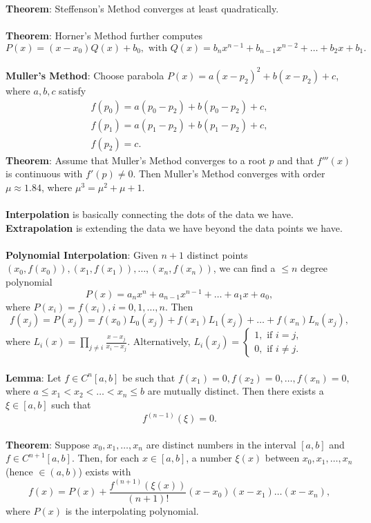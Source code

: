 \documentclass{article}
\begin{document}
\textbf{Theorem}: Steffenson’s Method converges at least quadratically. \\ \\
\textbf{Theorem}: Horner’s Method further computes $$P(x) = (x - x_0)Q(x) + b_0, \text{ with } Q(x) = b_nx^{n - 1} + b_{n - 1}x^{n - 2} + \dots + b_2x + b_1.$$ \\
\textbf{Muller's Method}: Choose parabola $P(x) = a(x - p_2)^2 + b(x - p_2) + c$, where $a, b, c$ satisfy \begin{align*}
    f(p_0) = a(p_0 - p_2) + b(p_0 - p_2) + c, \\
    f(p_1) = a(p_1 - p_2) + b(p_1 - p_2) + c, \\
    f(p_2) = c.
\end{align*} $ $ \\
\textbf{Theorem}: Assume that Muller's Method converges to a root $p$ and that $f'''(x)$ is continuous with $f'(p) \neq 0$. Then Muller’s Method converges with order $\mu \approx 1.84$, where $\mu^3 = \mu^2 + \mu + 1$. \\ \\
\textbf{Interpolation} is basically connecting the dots of the data we have. \textbf{Extrapolation} is extending the data we have beyond the data points we have. \\ \\
\textbf{Polynomial Interpolation}: Given $n + 1$ distinct points $(x_0, f(x_0)), (x_1, f(x_1)), \dots, (x_n, f(x_n))$, we can find a $\leq n$ degree polynomial $$P(x) = a_nx^n + a_{n - 1}x^{n - 1} + \dots + a_1x + a_0,$$ where $P(x_i) = f(x_i), i = 0, 1, \dots, n$. Then $$f(x_j) = P(x_j) = f(x_0)L_0(x_j) + f(x_1)L_1(x_j) + \dots + f(x_n)L_n(x_j),$$ where $L_i(x) = \prod_{j \neq i} \frac{x - x_j}{x_i - x_j}$. Alternatively, $L_i(x_j) = \begin{cases}
    1, \text{ if } i = j, \\
    0, \text{ if } i \neq j.
\end{cases}$ $ $ \\ \\
\textbf{Lemma}: Let $f \in C^n[a, b]$ be such that $f(x_1) = 0, f(x_2) = 0, \dots, f(x_n) = 0,$ where $a \leq x_1 < x_2 < \dots < x_n \leq b$ are mutually distinct. Then there exists a $\xi \in [a, b]$ such that $$f^{(n - 1)}(\xi) = 0.$$ \\
\textbf{Theorem}: Suppose $x_0, x_1, \dots, x_n$ are distinct numbers in the interval $[a, b]$ and $f \in C^{n + 1}[a, b].$ Then, for each $x \in [a, b]$, a number $\xi(x)$ between $x_0, x_1, \dots, x_n$ (hence $\in (a, b)$) exists with $$f(x) = P(x) + \frac{f^{(n + 1)}(\xi(x))}{(n + 1)!}(x - x_0)(x - x_1) \dots (x - x_n),$$ where $P(x)$ is the interpolating polynomial. \\ \\
\end{document}
